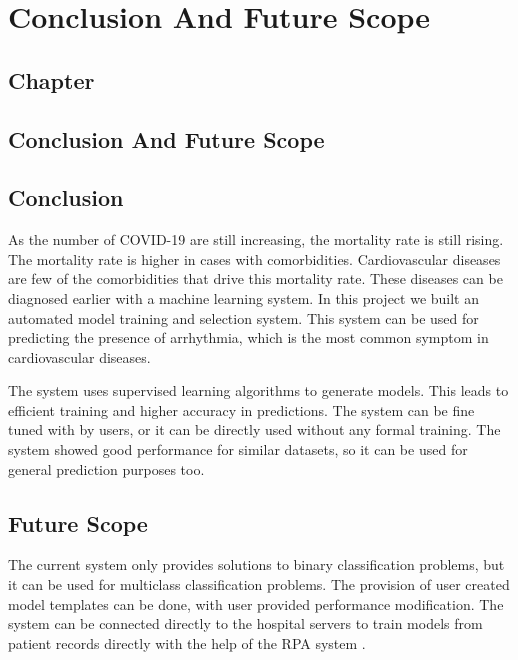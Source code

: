 \thispagestyle{fancy}
\chapter{Conclusion And Future Scope} \label{ch:conclusion_and_future_scope}
\section*{\centering Chapter \thechapter}
\section*{\centering Conclusion And Future Scope}

\section{Conclusion} \label{sec:conclusion}
As the number of COVID-19 are still increasing, the mortality rate is still rising. The mortality rate is higher in cases with comorbidities. Cardiovascular diseases are few of the comorbidities that drive this mortality rate. These diseases can be diagnosed earlier with a machine learning system. In this project we built an automated model training and selection system. This system can be used for predicting the presence of arrhythmia, which is the most common symptom in cardiovascular diseases.

The system uses supervised learning algorithms to generate models. This leads to efficient training and higher accuracy in predictions. The system can be fine tuned with by users, or it can be directly used without any formal training. The system showed good performance for similar datasets, so it can be used for general prediction purposes too.

\section{Future Scope} \label{sec:future_scope}
The current system only provides solutions to binary classification problems, but it can be used for multiclass classification problems. The provision of user created model templates can be done, with user provided performance modification. The system can be connected directly to the hospital servers to train models from patient records directly with the help of the RPA system \cite{ref_paper_self_rpa}.
